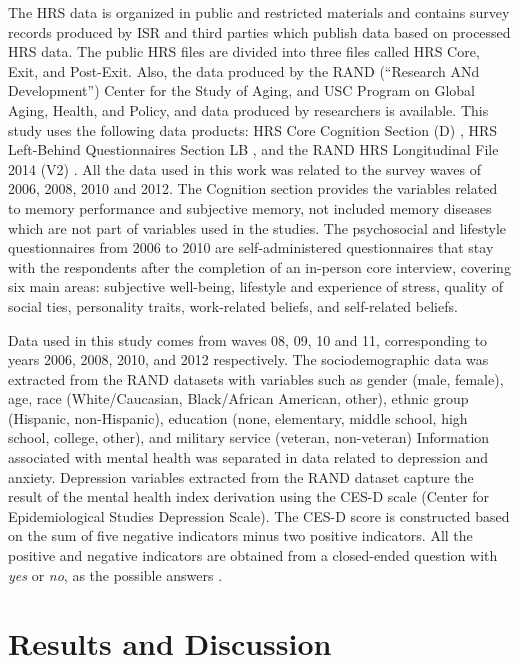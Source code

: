 \documentclass[conference,final,]{IEEEtran}
\begin{document}
The HRS data is organized in public and restricted materials and
contains survey records produced by ISR and third parties which publish
data based on processed HRS data. The public HRS files are divided into
three files called HRS Core, Exit, and Post-Exit. Also, the data
produced by the RAND (``Research ANd Development'') Center for the Study
of Aging, and USC Program on Global Aging, Health, and Policy, and data
produced by researchers is available. This study uses the following data
products: HRS Core Cognition Section (D) \cite{sonnega2014health}, HRS
Left-Behind Questionnaires Section LB \cite{smith2013psychosocial}, and
the RAND HRS Longitudinal File 2014 (V2) \cite{HRS2014}. All the data
used in this work was related to the survey waves of 2006, 2008, 2010
and 2012. The Cognition section provides the variables related to memory
performance and subjective memory, not included memory diseases which
are not part of variables used in the studies. The psychosocial and
lifestyle questionnaires from 2006 to 2010 are self-administered
questionnaires that stay with the respondents after the completion of an
in-person core interview, covering six main areas: subjective
well-being, lifestyle and experience of stress, quality of social ties,
personality traits, work-related beliefs, and self-related beliefs.

Data used in this study comes from waves 08, 09, 10 and 11,
corresponding to years 2006, 2008, 2010, and 2012 respectively. The
sociodemographic data was extracted from the RAND datasets with
variables such as gender (male, female), age, race (White/Caucasian,
Black/African American, other), ethnic group (Hispanic, non-Hispanic),
education (none, elementary, middle school, high school, college,
other), and military service (veteran, non-veteran) Information
associated with mental health was separated in data related to
depression and anxiety. Depression variables extracted from the RAND
dataset capture the result of the mental health index derivation using
the CES-D scale (Center for Epidemiological Studies Depression Scale).
The CES-D score is constructed based on the sum of five negative
indicators minus two positive indicators. All the positive and negative
indicators are obtained from a closed-ended question with \emph{yes} or
\emph{no}, as the possible answers \cite{cesd}.

\hypertarget{results-and-discussion}{%
\section{Results and Discussion}\label{results-and-discussion}}
\end{document}
